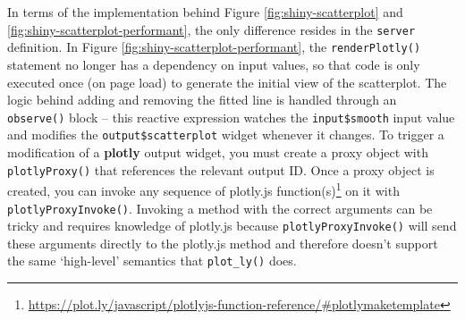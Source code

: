 \documentclass[
  12pt,
]{krantz}
\renewcommand{\href}[2]{#2\footnote{\url{#1}}}
\begin{document}
In terms of the implementation behind Figure \ref{fig:shiny-scatterplot} and \ref{fig:shiny-scatterplot-performant}, the only difference resides in the \texttt{server} definition. In Figure \ref{fig:shiny-scatterplot-performant}, the \texttt{renderPlotly()} statement no longer has a dependency on input values, so that code is only executed once (on page load) to generate the initial view of the scatterplot. The logic behind adding and removing the fitted line is handled through an \texttt{observe()} block -- this reactive expression watches the \texttt{input\$smooth} input value and modifies the \texttt{output\$scatterplot} widget whenever it changes. To trigger a modification of a \textbf{plotly} output widget, you must create a proxy object with \texttt{plotlyProxy()} that references the relevant output ID. Once a proxy object is created, you can invoke any sequence of \href{https://plot.ly/javascript/plotlyjs-function-reference/\#plotlymaketemplate}{plotly.js function(s)} on it with \texttt{plotlyProxyInvoke()}. Invoking a method with the correct arguments can be tricky and requires knowledge of plotly.js because \texttt{plotlyProxyInvoke()} will send these arguments directly to the plotly.js method and therefore doesn't support the same `high-level' semantics that \texttt{plot\_ly()} does.
\end{document}
